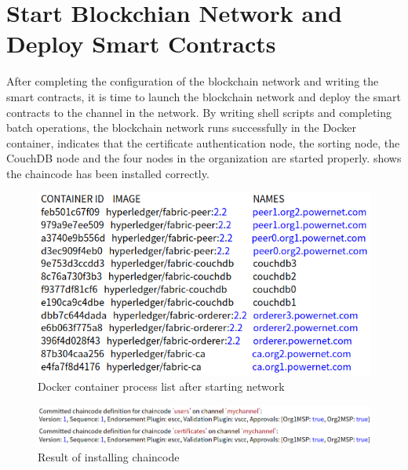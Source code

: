 \section{Start Blockchian Network and Deploy Smart Contracts}
After completing the configuration of the blockchain network and writing the smart contracts, it is time to launch the blockchain network and deploy the smart contracts to the channel in the network. By writing shell scripts and completing batch operations, the blockchain network runs successfully in the Docker container, indicates that the certificate authentication node, the sorting node, the CouchDB node and the four nodes in the organization are started properly. shows the chaincode has been installed correctly.
\begin{figure}[!htb]
    \centering
    \includegraphics[width=\textwidth]{img/dockerps.png}
    \caption{Docker container process list after starting network}
    \label{fig:dockerps}
\end{figure}

\begin{figure}[!htb]
    \centering
    \includegraphics[width=\textwidth]{img/installChaincode.png}
    \caption{Result of installing chaincode}
    \label{fig:installchaincode}
\end{figure}

